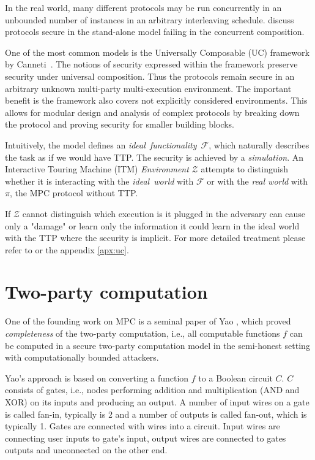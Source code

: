 \documentclass[
  digital, %
  twoside, %
  table,   %
  lof,     %
  lot,     %
]{fithesis3}
\newcounter{ph4_show_guides}
\theoremstyle{definition}
\theoremstyle{remark}
\begin{document}
In the real world, many different protocols may be run concurrently in an unbounded number of instances in an arbitrary interleaving schedule. \cite{Can06, Can13} discuss protocols secure in the stand-alone model failing in the concurrent composition.

One of the most common models is the Universally Composable (UC) framework by Canneti~\cite{Can01}. The notions of security expressed within the framework preserve security under universal composition. Thus the protocols remain secure in an arbitrary unknown multi-party multi-execution environment. The important benefit is the framework also covers not explicitly considered environments. This allows for modular design and analysis of complex protocols by breaking down the protocol and proving security for smaller building blocks.

Intuitively, the model defines an \emph{ideal~functionality}~$\mathcal{F}$, which naturally describes the task as if we would have TTP. The security is achieved by a \emph{simulation}. An Interactive Touring Machine (ITM) \emph{Environment} $\mathcal{Z}$ attempts to distinguish whether it is interacting with the \emph{ideal~world} with $\mathcal{F}$ or with the \emph{real world} with $\pi$, the MPC protocol without TTP. 

If $\mathcal{Z}$ cannot distinguish which execution is it plugged in the adversary can cause only a "damage" or learn only the information it could learn in the ideal world with the TTP where the security is implicit. For more detailed treatment please refer to \cite{Can01, CLOS02, Lin03, G09, CDN15, Lin17} or the appendix \ref{apx:uc}.

\section{Two-party computation}\label{sec:soa:2pc} %
One of the founding work on MPC is a seminal paper of Yao \cite{Yao86}, which proved \emph{completeness} of the two-party computation, i.e., all computable functions $f$ can be computed in a secure two-party computation model in the semi-honest setting with computationally bounded attackers. 

Yao's approach is based on converting a function $f$ to a Boolean circuit $C$. $C$ consists of gates, i.e., nodes performing addition and multiplication (AND and XOR) on its inputs and producing an output. A number of input wires on a gate is called fan-in, typically is 2 and a number of outputs is called fan-out, which is typically 1. Gates are connected with wires into a circuit. Input wires are connecting user inputs to gate's input, output wires are connected to gates outputs and unconnected on the other end.
\end{document}
